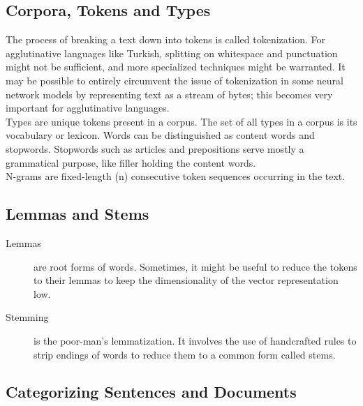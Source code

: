 \documentclass[french]{article}
\begin{document}
\subsection{Corpora, Tokens and Types}

The process of breaking a text down into tokens is called tokenization. For agglutinative languages like Turkish, splitting on whitespace and punctuation might not be sufficient, and more specialized techniques might be warranted. It may be possible to entirely circumvent the issue of tokenization in some neural network models by representing text as a stream of bytes; this becomes very important for agglutinative languages.\\

Types are unique tokens present in a corpus. The set of all types in a corpus is its vocabulary or lexicon. Words can be distinguished as content words and stopwords.  Stopwords such as articles and prepositions serve mostly a grammatical purpose, like filler holding the content words.\\

N-grams are fixed-length (n) consecutive token sequences occurring in the text.

\subsection{Lemmas and Stems}

\begin{description}
\item [Lemmas] are root forms of words. Sometimes, it might be useful to reduce the tokens to their lemmas to keep the dimensionality of the vector representation low.
\item [Stemming] is the poor-man’s lemmatization. It involves the use of handcrafted rules to strip endings of words to reduce them to a common form called stems.
\end{description}

\subsection{Categorizing Sentences and Documents}
\end{document}
